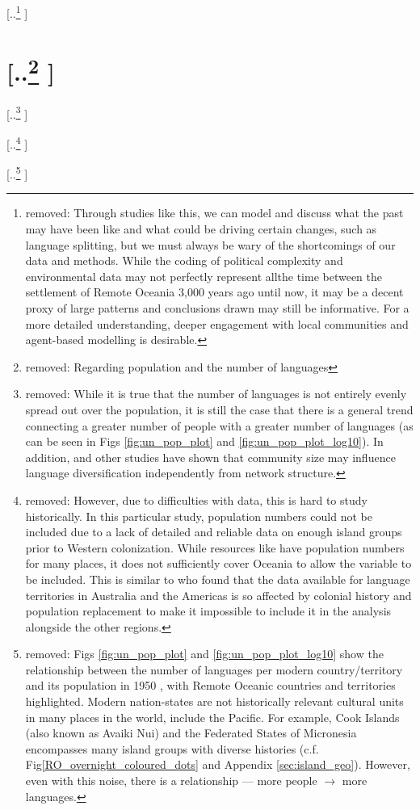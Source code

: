 \documentclass[unnumsec,webpdf,modern,medium]{oup-authoring-template}
\providecommand{\DIFdeltex}[1]{{\protect\color{red} [..\footnote{removed: #1} ]}} %
\providecommand{\DIFdel}[1]{\texorpdfstring{\DIFdeltex{#1}}{}} %
\begin{document}
\DIFdel{Through studies like this, we can model and discuss what the past may have been like and what could be driving certain changes, such as language splitting, but we must always be wary of the shortcomings of our data and methods. While the coding of political complexity and environmental data may not perfectly represent allthe time between the settlement of Remote Oceania 3,000 years ago until now, it may be a decent proxy of large patterns and conclusions drawn may still be informative. For a more detailed understanding, deeper engagement with local communities and agent-based modelling is desirable.
}%

\section{\DIFdel{Regarding population and the number of languages}}
\addtocounter{section}{-1}%
\DIFdel{While it is true that the number of languages is not entirely evenly spread out over the population, it is still the case that there is a general trend connecting a greater number of people with a greater number of languages (as can be seen in Figs \ref{fig:un_pop_plot} and \ref{fig:un_pop_plot_log10}). In addition,  \citet{raviv2019larger} and other studies have shown that community size may influence language diversification independently from network structure. 
}%

\DIFdel{However, due to difficulties with data, this is hard to study historically. In this particular study, population numbers could not be included due to a lack of detailed and reliable data on enough island groups prior to Western colonization. While resources like \citet{elcat} have population numbers for many places, it does not sufficiently cover Oceania to allow the variable to be included. This is similar to \citet[7340-7341]{curriemace2009} who found that the data available for language territories in Australia and the Americas is so affected by colonial history and population replacement to make it impossible to include it in the analysis alongside the other regions. 
}%

\DIFdel{Figs \ref{fig:un_pop_plot} and \ref{fig:un_pop_plot_log10} show the relationship between the number of languages per modern country/territory \citep{glottolog3} and its population in 1950 \citep{UN_pop}, with Remote Oceanic countries and territories highlighted. Modern nation-states are not historically relevant cultural units in many places in the world, include the Pacific. For example, Cook Islands (also known as Avaiki Nui) and the Federated States of Micronesia encompasses many island groups with diverse histories (c.f. Fig\ref{RO_overnight_coloured_dots} and Appendix \ref{sec:island_geo}).
However, even with this noise, there is a relationship --- more people $\rightarrow$ more languages.
}%
\end{document}
